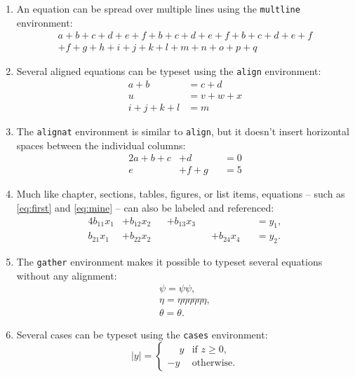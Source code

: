 \documentclass[
  digital,     %
  oneside,     %
  nosansbold,  %
  nocolorbold, %
  lof,         %
  lot,         %
]{fithesis4}
\begin{document}
\begin{enumerate}
  \item An equation can be spread over multiple lines using the
    \texttt{multline} environment:
    \begin{multline}
      a + b + c + d + e + f + b + c + d + e + f + b + c + d + e +
f \\
      + f + g + h + i + j + k + l + m + n + o + p + q
    \end{multline}

  \item Several aligned equations can be typeset using the
    \texttt{align} environment:
    \begin{align}
              a + b &= c + d     \\
                  u &= v + w + x \\[1ex]
      i + j + k + l &= m
    \end{align}

  \item The \texttt{alignat} environment is similar to
    \texttt{align}, but it doesn't insert horizontal spaces between
    the individual columns:
    \begin{alignat}{2}
      a + b + c &+ d       &   &= 0 \\
              e &+ f + g   &   &= 5
    \end{alignat}

  \item Much like chapter, sections, tables, figures, or list
    items, equations -- such as \eqref{eq:first} and
    \eqref{eq:mine} -- can also be labeled and referenced:
    \begin{alignat}{4}
      b_{11}x_1 &+ b_{12}x_2  &  &+ b_{13}x_3  &  &             &
        &= y_1,                   \label{eq:first} \\
      b_{21}x_1 &+ b_{22}x_2  &  &             &  &+ b_{24}x_4  &
        &= y_2. \tag{My equation} \label{eq:mine}
    \end{alignat}

  \item The \texttt{gather} environment makes it possible to
    typeset several equations without any alignment:
    \begin{gather}
      \psi = \psi\psi, \\
      \eta = \eta\eta\eta\eta\eta\eta, \\
      \theta = \theta.
    \end{gather}

  \item Several cases can be typeset using the \texttt{cases}
    environment:
    \begin{equation}
      |y| = \begin{cases}
        \phantom-y & \text{if }z\geq0, \\
                -y & \text{otherwise}.
      \end{cases}
    \end{equation}
\end{enumerate}
\end{document}
